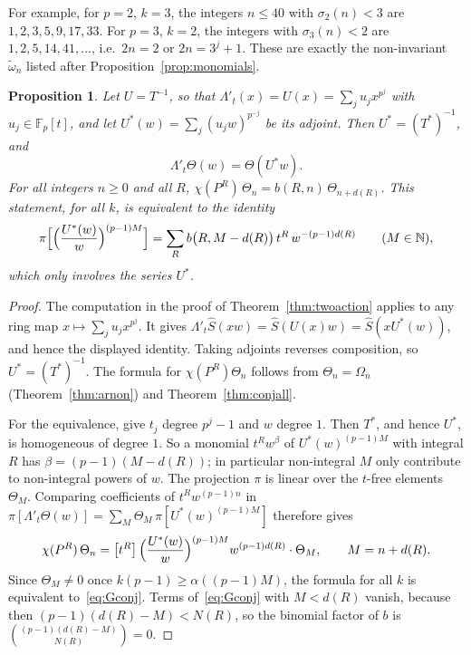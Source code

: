 \documentclass[11pt]{amsart}
\newtheorem{proposition}[theorem]{Proposition}
\theoremstyle{definition}
\theoremstyle{remark}
\newcommand{\F}{\mathbb{F}_p}
\newcommand{\wt}{\widetilde{\omega}}
\newcommand{\coef}[1]{\left[#1\right]}
\begin{document}
For example, for $p=2$, $k=3$, the integers $n\le40$ with $\sigma_2(n)<3$ are
$1,2,3,5,9,17,33$.  For $p=3$, $k=2$, the integers with $\sigma_3(n)<2$ are
$1,2,5,14,41,\dots$, i.e.\ $2n=2$ or $2n=3^j+1$.  These are exactly the
non-invariant $\wt_n$ listed after Proposition~\ref{prop:monomials}.

\begin{proposition}\label{prop:twoconj}
Let $U=T^{-1}$, so that $\Lambda'_t(x)=U(x)=\sum_ju_jx^{p^j}$ with
$u_j\in\F[t]$, and let $U^*(w)=\sum_j(u_jw)^{p^{-j}}$ be its adjoint.  Then
$U^*=(T^*)^{-1}$, and
\[
  \Lambda'_t\Theta(w)=\Theta(U^*w).
\]
For all integers $n\ge0$ and all $R$,
$\chi(P^R)\,\Theta_n=b(R,n)\,\Theta_{n+d(R)}$.  This statement, for all $k$,
is equivalent to the identity
\begin{equation}\label{eq:Gconj}
  \pi\Bigl[\Bigl(\frac{U^*(w)}{w}\Bigr)^{(p-1)M}\Bigr]
  =\sum_R b\bigl(R,M-d(R)\bigr)\,t^R\,w^{-(p-1)d(R)}\qquad(M\in\mathbb{N}),
\end{equation}
which only involves the series $U^*$.
\end{proposition}

\begin{proof}
The computation in the proof of Theorem~\ref{thm:twoaction} applies to any
ring map $x\mapsto\sum_ju_jx^{p^j}$.  It gives
$\Lambda'_t\widehat S(xw)=\widehat S(U(x)w)=\widehat S(xU^*(w))$, and hence
the displayed identity.  Taking adjoints reverses composition, so $U^*=(T^*)^{-1}$.
The formula for $\chi(P^R)\Theta_n$ follows from $\Theta_n=\Omega_n$
(Theorem~\ref{thm:arnon}) and Theorem~\ref{thm:conjall}.

For the equivalence, give $t_j$ degree $p^j-1$ and $w$ degree $1$.  Then
$T^*$, and hence $U^*$, is homogeneous of degree $1$.  So a monomial
$t^Rw^\beta$ of $U^*(w)^{(p-1)M}$ with integral $R$ has
$\beta=(p-1)(M-d(R))$; in particular non-integral $M$ only contribute to
non-integral powers of $w$.  The projection $\pi$ is linear over the $t$-free
elements $\Theta_M$.  Comparing coefficients of $t^Rw^{(p-1)n}$ in
$\pi[\Lambda'_t\Theta(w)]=\sum_M\Theta_M\,\pi[U^*(w)^{(p-1)M}]$ therefore
gives
\[
  \chi(P^R)\,\Theta_n=\coef{t^R}\Bigl(\frac{U^*(w)}{w}\Bigr)^{(p-1)M}w^{(p-1)d(R)}
  \cdot\Theta_M,\qquad M=n+d(R).
\]
Since $\Theta_M\ne0$ once $k(p-1)\ge\alpha((p-1)M)$, the formula for all $k$
is equivalent to~\eqref{eq:Gconj}.  Terms of~\eqref{eq:Gconj} with $M<d(R)$
vanish, because then $(p-1)(d(R)-M)<N(R)$, so the binomial factor of $b$ is
$\binom{(p-1)(d(R)-M)}{N(R)}=0$.
\end{proof}
\end{document}
